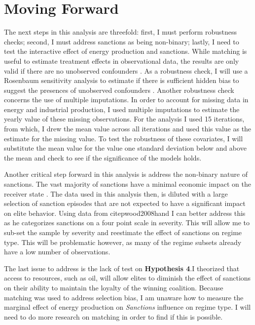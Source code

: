 \documentclass[a4paper]{article}\usepackage[]{graphicx}\usepackage[]{color}
\begin{document}
\section*{\large{Moving Forward}}

The next steps in this analysis are threefold: first, I must perform robustness checks; second, I must address sanctions as being non-binary; lastly, I need to test the interactive effect of energy production and sanctions. While matching is useful to estimate treatment effects in observational data, the results are only valid if there are no unobserved confounders \citep{ keele2010overview}. As a robustness check, I will use a Rosenbaum sensitivity analysis to estimate if there is sufficient hidden bias to suggest the presences of unobserved confounders \citep{rosenbaum2002observational}. Another robustness check concerns the use of multiple imputations. In order to account for missing data in energy and industrial production, I used multiple imputations to estimate the yearly value of these missing observations. For the analysis I used 15 iterations, from which, I drew the mean value across all iterations and used this value as the estimate for the missing value.  To test the robustness of these covariates, I will substitute the mean value for the value one standard deviation below and above the mean and check to see if the significance of the models holds.  
\par
Another critical step forward in this analysis is address the non-binary nature of sanctions. The vast majority of sanctions have a minimal economic impact on the receiver state \citep{wood2008hand}. The data used in this analysis then, is diluted with a large selection of sanction episodes that are not expected to have a significant impact on elite behavior. Using data from citep{wood2008hand} I can better address this as he categorizes sanctions on a four point scale in severity. This will allow me to sub-set the sample by severity and reestimate the effect of sanctions on regime type. This will be problematic however, as many of the regime subsets already have a low number of observations. 
\par
The last issue to address is the lack of test on \textbf{Hypothesis 4}.I theorized that access to resources, such as oil, will allow elites to diminish the effect of sanctions on their ability to maintain the loyalty of the winning coalition. Because matching was used to address selection bias, I am unaware how to measure the marginal effect of energy production on \textit{Sanctions} influence on regime type. I will need to do more research on matching in order to find if this is possible. 
\end{document}
